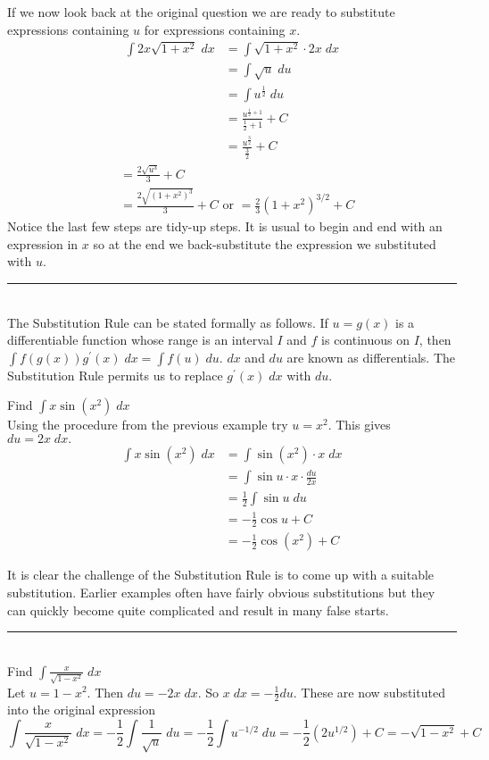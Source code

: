 If we now look back at the original question we are ready to substitute expressions containing $u$ for expressions containing $x$.
\begin{align*}\int 2 x \sqrt{1 +x^{2}}\; d x &  = \int \sqrt{1 +x^{2}} \cdot 2 x\; d x \\
 &  = \int \sqrt{u}\; d u \\
 &  = \int u^{\frac{1}{2}}\; d u \\
 &  = \frac{u^{\frac{1}{2} +1}}{\frac{1}{2} +1} +C \\
 &  = \frac{u^{\frac{3}{2}}}{\frac{3}{2}} +C\end{align*}
\begin{align*} &  = \frac{2 \sqrt{u^{3}}}{3} +C \\
 &  = \frac{2 \sqrt{\left (1 +x^{2}\right )^{3}}}{3} +C \text{ or }= \frac{2}{3} \left (1 +x^{2}\right )^{3/2} +C\end{align*}Notice the last few steps are tidy-up steps. It is usual to begin and end with an expression in $x$ so at the end we back-substitute the expression we substituted with $u$. \\
\rule{6.8cm}{0.5pt}\\
The Substitution Rule can be stated formally as follows. If $u =g (x)$ is a differentiable function whose range is an interval $I$ and $f$ is continuous on $I$, then $\int f \left (g \left (x\right )\right ) g^{ \prime } \left (x\right )\; d x =\int f \left (u\right )\; d u$. $d x$ and $d u$ are known as differentials. The Substitution Rule permits us to replace $g^{ \prime } \left (x\right )\; d x$ with $d u$. 

\example Find $\int x \sin  \left (x^{2}\right )\; dx$\medskip\\
\solution Using the procedure from the previous example try $u =x^{2}$. This gives $d u =2 x\; d x\text{.}$
\begin{align*}\int x \sin  \left (x^{2}\right )\; d x &  = \int \sin  \left (x^{2}\right ) \cdot x\; d x \\
 &  = \int \sin  u \cdot x\cdot\frac{du}{2x} \\
 &  = \frac{1}{2} \int \sin  u\; d u \\
 &  =  -\frac{1}{2} \cos  u +C \\
 &  =  -\frac{1}{2} \cos  \left (x^{2}\right ) +C\end{align*}

It is clear the challenge of the Substitution Rule is to come up with a suitable substitution. Earlier examples often have fairly obvious substitutions but they can quickly become quite complicated and result in many false starts. \\
\rule{6.8cm}{0.5pt}\\
\example Find $\int \frac{x}{\sqrt{1 -x^{2}}}\; d x$\medskip\\
\solution Let $u =1 -x^{2}$. Then $d u = -2 x\; d x$. So $x\; d x = -\frac{1}{2} d u$. These are now substituted into the original expression
$$\int \frac{x}{\sqrt{1 -x^{2}}}\; d x = -\frac{1}{2} \int \frac{1}{\sqrt{u}}\; d u = -\frac{1}{2} \int u^{ -1/2}\; d u = -\frac{1}{2} \left (2 u^{1/2}\right ) +C = -\sqrt{1 -x^{2}} +C$$

